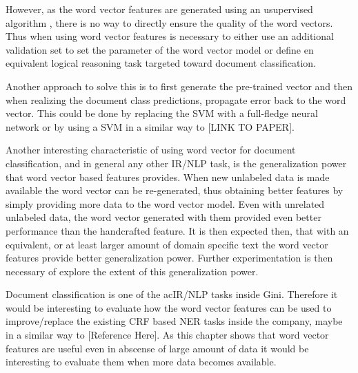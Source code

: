 However, as the word vector features are  generated using an usupervised
algorithm , there is no way to directly ensure the quality of the word
vectors. Thus when using  word vector features is necessary to either  use an
additional validation set  to set the parameter of the word vector model or
define en equivalent logical reasoning task targeted toward document
classification. 

Another approach to solve this is to first generate the pre-trained vector
and then when realizing the document class predictions, propagate error back
to the word vector. This could be done by replacing the \ac{SVM} with a
full-fledge neural network or by using a SVM in a similar way to [LINK TO PAPER].

Another interesting characteristic of using word vector for document
classification, and in general any other \ac{IR}/\ac{NLP} task,  is the
generalization power that word vector based features provides.
When new unlabeled data is made available the word vector can be
re-generated, thus obtaining better features by simply providing more data to
the word vector model. Even with unrelated  unlabeled data, the word vector
generated with them provided even better performance than the handcrafted
feature. It is then expected then, that with an equivalent, or at least larger
amount of domain specific text the word vector features provide better
generalization power. Further experimentation is then necessary  of
explore the extent of this generalization power.

Document classification is one of the ac{IR}/\ac{NLP} tasks inside Gini.
Therefore it would be interesting to evaluate how the word vector features
can be used to improve/replace the existing \ac{CRF} based \ac{NER} tasks
inside the company, maybe in a similar way to [Reference  Here]. As this
chapter shows that word vector features are useful even in abscense of
large amount of data it would be interesting to evaluate them  when more data
becomes available.










 

